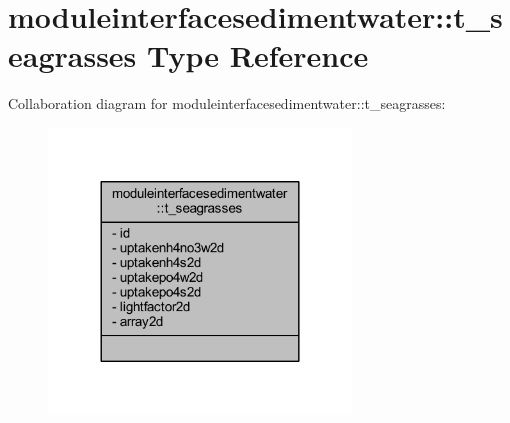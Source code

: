 \hypertarget{structmoduleinterfacesedimentwater_1_1t__seagrasses}{}\section{moduleinterfacesedimentwater\+:\+:t\+\_\+seagrasses Type Reference}
\label{structmoduleinterfacesedimentwater_1_1t__seagrasses}


Collaboration diagram for moduleinterfacesedimentwater\+:\+:t\+\_\+seagrasses\+:\nopagebreak
\begin{figure}[H]
\begin{center}
\leavevmode
\includegraphics[width=228pt]{structmoduleinterfacesedimentwater_1_1t__seagrasses__coll__graph}
\end{center}
\end{figure}
